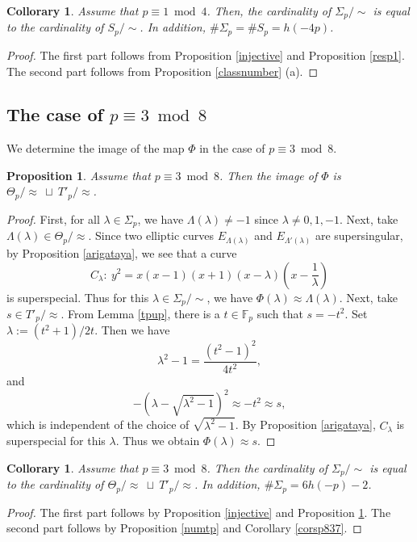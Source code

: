 \documentclass[10pt,a4paper]{amsart}
\theoremstyle{plain}
\newtheorem{prop}[defn]{Proposition}
\newtheorem{cor}[defn]{Collorary}
\newcommand{\lm}{\lambda}
\newcommand{\Lm}{\Lambda}
\newcommand{\fp}{\mathbb{F}_p}
\begin{document}
\begin{cor}
\label{number1}
Assume that $p \equiv 1 \bmod4$. Then, the cardinality of ${\Sigma}_{p}/\sim$ is equal to the cardinality of $S_{p}/\sim$. In addition, $\#{\Sigma}_{p}=\# S_{p}=h(-4p)$.
\end{cor}

\begin{proof}
    The first part follows from Proposition \ref{injective} and Proposition \ref{resp1}. The second part follows from Proposition \ref{classnumber} (a).
    \end{proof}

\subsection{The case of {$p \equiv 3  \bmod 8$}}
We determine the image of the map $\Phi$ in the case of $p \equiv 3 \bmod 8$. 

\begin{prop}
\label{sur3}
Assume that $p \equiv 3 \bmod 8$. Then the image of $\Phi$ is ${\Theta}_{p}/\approx \ \sqcup \  T'_p/\approx$.

\end{prop}

\begin{proof}
First, for all $\lm \in {\Sigma}_{p}$, we have $\Lm(\lm) \neq -1$ since $\lm \neq 0,1,-1$. Next, take $\Lm(\lm) \in {\Theta}_p/\approx$. Since two elliptic curves $E_{\Lm(\lm)}$ and $E_{{\Lm}'(\lm)}$ are supersingular, by Proposition \ref{arigataya}, we see that a curve
        \[
        C_{\lm}:\ y^2=x(x-1)(x+1)(x-\lm)\left(x-\frac{1}{\lm} \right)
        \]
        is superspecial. Thus for this $\lm \in {\Sigma}_p /\sim$, we have ${\Phi}(\lm) \approx \Lm(\lm)$.
        Next, take $s\in T'_p / \approx$. 
        From Lemma \ref{tpup}, there is a $t\in \fp$ such that $s=-t^2$. Set $\lm:=(t^2+1)/2t$. Then we have 
        \[
        {\lm}^2-1=\frac{(t^2-1)^2}{4t^2},
        \]
        and
        \[
        -(\lm-\sqrt{{\lm}^2-1})^2\approx -t^2 \approx s,
        \]
        which is independent of the choice of $\sqrt{{\lm}^2-1}$. By Proposition \ref{arigataya}, $C_{\lm}$ is superspecial for this $\lm$. Thus we obtain ${\Phi}(\lm) \approx s$.
\end{proof}


\begin{cor}
\label{number3}
    Assume that $p \equiv 3 \bmod 8$. Then the cardinality of ${\Sigma}_p /\sim$ is equal to the cardinality of ${\Theta}_{p} /\approx \ \sqcup \ T'_p / \approx$. In addition, 
    $\# {\Sigma}_p=6h(-p)-2$.
\end{cor}
\begin{proof}
    The first part follows by Proposition \ref{injective} and Proposition \ref{sur3}. The second part follows by Proposition \ref{numtp} and Corollary \ref{corsp837}.
\end{proof}
\end{document}
